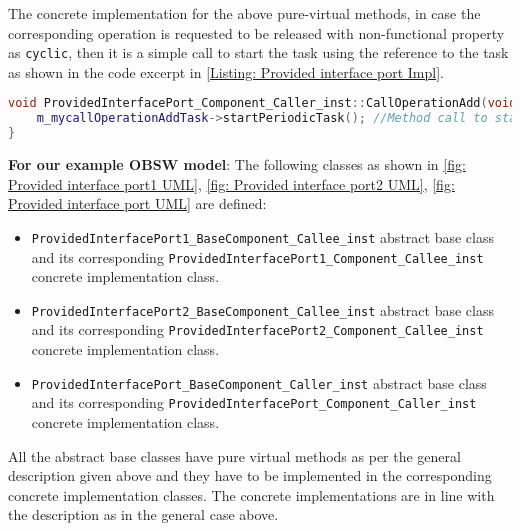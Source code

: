 The concrete implementation for the above pure-virtual methods, in case the corresponding operation is requested to be released with non-functional property as \texttt{cyclic}, then it is a simple call to start the task using the reference to the task as shown in the code excerpt in \cref{Listing: Provided interface port Impl}.

\begin{Listing}
\begin{lstlisting}[language=C++]
void ProvidedInterfacePort_Component_Caller_inst::CallOperationAdd(void) {
	m_mycallOperationAddTask->startPeriodicTask(); //Method call to start the task
}
\end{lstlisting}
\caption{Code excerpt from the generated code for operation \texttt{CallOperationAdd} in \texttt{Provided\allowbreak Interface\allowbreak Port\_\allowbreak Component\_\allowbreak Caller\_\allowbreak inst} which has non-functional property set as \texttt{Cyclic}}
\label{Listing: Provided interface port Impl}
\end{Listing}

\textbf{For our example OBSW model}: The following classes as shown in \cref{fig: Provided interface port1 UML}, \cref{fig: Provided interface port2 UML}, \cref{fig: Provided interface port UML} are defined:
\begin{itemize}
\item \texttt{Provided\allowbreak Interface\allowbreak Port1\_\allowbreak Base\allowbreak Component\_\allowbreak Callee\_\allowbreak inst} abstract base class and its corresponding \texttt{Provided\allowbreak Interface\allowbreak Port1\_\allowbreak Component\_\allowbreak Callee\_\allowbreak inst} concrete implementation class.
\item \texttt{Provided\allowbreak Interface\allowbreak Port2\_\allowbreak Base\allowbreak Component\_\allowbreak Callee\_\allowbreak inst} abstract base class and its corresponding \texttt{Provided\allowbreak Interface\allowbreak Port2\_\allowbreak Component\_\allowbreak Callee\_\allowbreak inst} concrete implementation class.
\item \texttt{Provided\allowbreak Interface\allowbreak Port\_\allowbreak Base\allowbreak Component\_\allowbreak Caller\_\allowbreak inst} abstract base class and its corresponding \texttt{Provided\allowbreak Interface\allowbreak Port\_\allowbreak Component\_\allowbreak Caller\_\allowbreak inst} concrete implementation class. 
\end{itemize} 

All the abstract base classes have pure virtual methods as per the general description given above and they have to be implemented in the corresponding concrete implementation classes. The concrete implementations are in line with the description as in the general case above.

